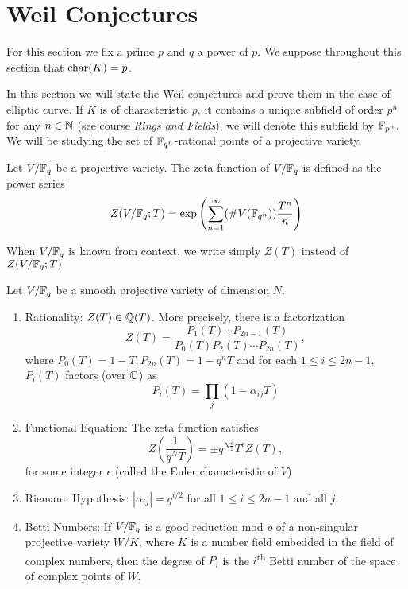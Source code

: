 \section{Weil Conjectures}
\label{sec:finite-fields}

For this section we fix a prime $p$ and $q$ a power of $p$.
We suppose throughout this section that $\operatorname{char}(K) = p$.

In this section we will state the Weil conjectures and prove them in the
case of elliptic curve.
If $K$ is of characteristic $p$,
it contains a unique subfield of order $p^n$ for any $n \in \mathbb{N}$ (see
course \emph{Rings and Fields}), we will denote this subfield by $\mathbb{F}_{p^n}$.
We will be studying the set of
$\mathbb{F}_{q^n}$-rational points of a projective variety.

\begin{definition}
	Let $V/\mathbb{F}_q$ be a projective variety.
	The zeta function of $V/\mathbb{F}_q$ is defined as the power series
	\begin{equation*}
		Z(V/\mathbb{F}_q; T) = \exp\left(\sum_{n=1}^\infty (\#V(\mathbb{F}_{q^n}))
		\frac{T^n}{n}\right)
	\end{equation*}
\end{definition}

\begin{notation}
	When $V/\mathbb{F}_q$ is known from context, we write simply $Z(T)$
	instead of $Z(V/\mathbb{F}_q; T)$
\end{notation}

\begin{theorem}
	\label{thm:weil}
	Let $V/\mathbb{F}_q$ be a smooth projective variety of dimension $N$.
	\begin{enumerate}[label=(\alph*)]
		\item Rationality: $Z(T) \in \mathbb{Q}(T)$. More precisely, 
			there is a factorization
			\begin{equation*}
				Z(T) = \frac{P_1(T)\cdots P_{2n-1}(T)}
				{P_0(T)P_2(T) \cdots P_{2n}(T)},
			\end{equation*}
			where $P_0(T) = 1 - T, P_{2n}(T) = 1 - q^nT$ and for each
			$1 \leq i \leq 2n - 1$, $P_i(T)$ factors (over $\mathbb{C}$) as
			\begin{equation*}
				P_i(T) = \prod_j (1 - \alpha_{ij}T)
			\end{equation*}
		\item Functional Equation: The zeta function satisfies
			\begin{equation*}
				Z\left(\frac{1}{q^NT}\right) = \pm q^{N\frac{\epsilon}{2}}
				T^{\epsilon} Z(T),
			\end{equation*}
			for some integer $\epsilon$ (called the Euler characteristic of $V$)
		\item Riemann Hypothesis: $|\alpha_{ij}| = q^{i/2}$
			for all $1 \leq i \leq 2n - 1$ and all $j$.
		\item Betti Numbers: If $V/\mathbb{F}_q$ is a good reduction mod $p$ of a
			non-singular projective variety $W/K$, where $K$ is a number
			field embedded in the field of complex numbers, then the degree
			of $P_i$ is the $i$\textsuperscript{th} Betti number of the space
			of complex points of $W$. 
	\end{enumerate}
\end{theorem}

